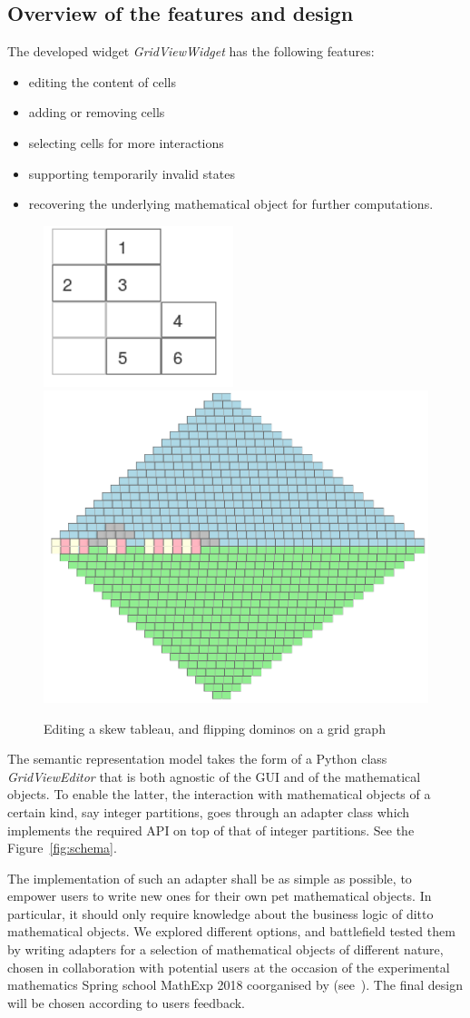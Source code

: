 \documentclass{deliverablereport}
\begin{document}
\subsection{Overview of the features and design}

The developed \Jupyter widget \emph{GridViewWidget} has the following
features:
\begin{itemize}
\item editing the content of cells
\item adding or removing cells
\item selecting cells for more interactions
\item supporting temporarily invalid states
\item recovering the underlying mathematical object for further
  computations.
\end{itemize}

\begin{figure}
  \begin{center}
    \includegraphics[width=.20\textwidth]{images/SkewTableauWidget}
    \qquad
    \includegraphics[width=.30\textwidth]{images/dominos-azteque}
  \end{center}
  \caption{Editing a skew tableau, and flipping dominos on a grid graph}
\end{figure}

The semantic representation model takes the form of a Python class
\emph{GridViewEditor} that is both agnostic of the GUI and of the
mathematical objects. To enable the latter, the interaction with
mathematical objects of a certain kind, say integer partitions, goes
through an adapter class which implements the required API on top of
that of integer partitions. See the Figure~\ref{fig:schema}.

The implementation of such an adapter shall be as simple as possible,
to empower users to write new ones for their own pet mathematical
objects. In particular, it should only require knowledge about the
business logic of ditto mathematical objects. We explored different
options, and battlefield tested them by writing adapters for a
selection of mathematical objects of different nature, chosen in
collaboration with potential users at the occasion of the experimental
mathematics Spring school MathExp 2018 coorganised by \ODK
(see~). The final design will be
chosen according to users feedback.
\end{document}
